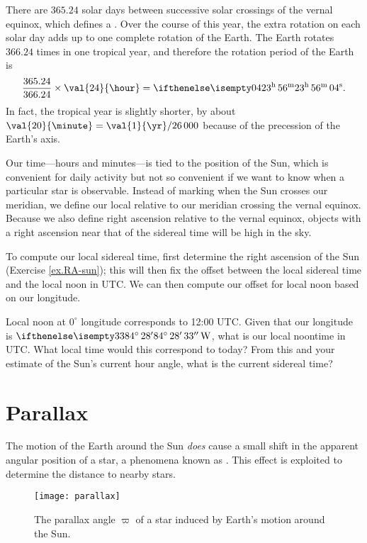 There are $365.24$ solar days between successive solar crossings of the vernal equinox, which defines a .  Over the course of this year, the extra rotation on each solar day adds up to one complete rotation of the Earth.  The Earth rotates $366.24$ times in one tropical year, and therefore the rotation period of the Earth is
\[ \frac{365.24}{366.24}\times \val{24}{\hour} =  \hrangle{23}{56}{04}.  \]
In fact, the tropical year is slightly shorter, by about $\val{20}{\minute} = \val{1}{\yr}/26\,000$ because of the precession of the Earth's axis.

Our time---hours and minutes---is tied to the position of the Sun, which is convenient for daily activity but not so convenient if we want to know when a particular star is observable.  Instead of marking when the Sun crosses our meridian, we define our local  relative to our meridian crossing the vernal equinox.  Because we also define right ascension relative to the vernal equinox, objects with a right ascension near that of the sidereal time will be high in the sky.

To compute our local sidereal time, first determine the right ascension of the Sun (Exercise \ref{ex.RA-sun}); this will then fix the offset between the local sidereal time and the local noon in UTC.  We can then compute our offset for local noon based on our longitude.

\begin{exercisebox}
Local noon at $0^{\circ}$ longitude corresponds to 12:00 UTC. Given that our longitude is $\dec{84}{28}{33}\,\mathrm{W}$, what is our local noontime in UTC.  What local time would this correspond to today? From this and your estimate of the Sun's current hour angle, what is the current sidereal time?
\end{exercisebox}

\section{Parallax}

The motion of the Earth around the Sun \emph{does} cause a small shift in the apparent angular position of a star, a phenomena known as .  This effect is exploited to determine the distance to nearby stars.  

\begin{figure*}[htb]
\texttt{[image: parallax]}
\caption[The parallax angle of a star]{The parallax angle $\varpi$ of a star induced by Earth's motion around the Sun.}
\label{f.parallax}
\end{figure*}

